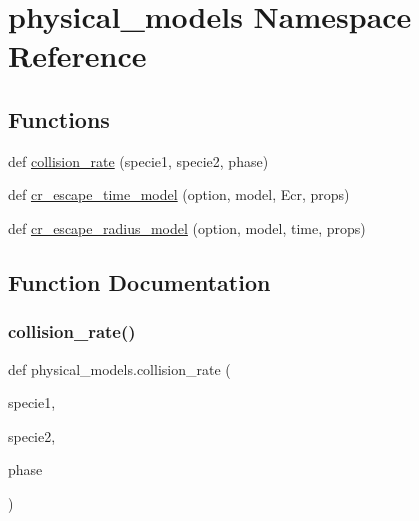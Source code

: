\hypertarget{namespacephysical__models}{}\section{physical\+\_\+models Namespace Reference}
\label{namespacephysical__models}
\subsection*{Functions}
\begin{DoxyCompactItemize}
\item 
def \hyperlink{namespacephysical__models_af478edcf1f8630528bf5af8e6c9a767c}{collision\+\_\+rate} (specie1, specie2, phase)
\item 
def \hyperlink{namespacephysical__models_a9704b22609ef5b0831d6fe42d69b3018}{cr\+\_\+escape\+\_\+time\+\_\+model} (option, model, Ecr, props)
\item 
def \hyperlink{namespacephysical__models_a059758252347063914ae1df4f89ad5c0}{cr\+\_\+escape\+\_\+radius\+\_\+model} (option, model, time, props)
\end{DoxyCompactItemize}


\subsection{Function Documentation}
\mbox{\label{namespacephysical__models_af478edcf1f8630528bf5af8e6c9a767c}} 
\subsubsection{\texorpdfstring{collision\+\_\+rate()}{collision\_rate()}}
{\footnotesize\ttfamily def physical\+\_\+models.\+collision\+\_\+rate (\begin{DoxyParamCaption}\item[{}]{specie1,  }\item[{}]{specie2,  }\item[{}]{phase }\end{DoxyParamCaption})}

\mbox{\label{namespacephysical__models_a059758252347063914ae1df4f89ad5c0}} 
